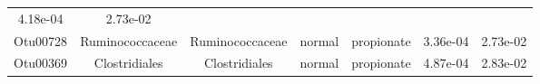 \documentclass[11pt,]{article}
\begin{document}
\begin{longtable}[]{@{}ccccccc@{}}
\begin{minipage}[t]{0.09\columnwidth}
4.18e-04\strut
\end{minipage} & \begin{minipage}[t]{0.09\columnwidth}\centering\strut
2.73e-02\strut
\end{minipage}\tabularnewline
\begin{minipage}[t]{0.09\columnwidth}\centering\strut
Otu00728\strut
\end{minipage} & \begin{minipage}[t]{0.17\columnwidth}\centering\strut
Ruminococcaceae\strut
\end{minipage} & \begin{minipage}[t]{0.17\columnwidth}\centering\strut
Ruminococcaceae\strut
\end{minipage} & \begin{minipage}[t]{0.09\columnwidth}\centering\strut
normal\strut
\end{minipage} & \begin{minipage}[t]{0.11\columnwidth}\centering\strut
propionate\strut
\end{minipage} & \begin{minipage}[t]{0.09\columnwidth}\centering\strut
3.36e-04\strut
\end{minipage} & \begin{minipage}[t]{0.09\columnwidth}\centering\strut
2.73e-02\strut
\end{minipage}\tabularnewline
\begin{minipage}[t]{0.09\columnwidth}\centering\strut
Otu00369\strut
\end{minipage} & \begin{minipage}[t]{0.17\columnwidth}\centering\strut
Clostridiales\strut
\end{minipage} & \begin{minipage}[t]{0.17\columnwidth}\centering\strut
Clostridiales\strut
\end{minipage} & \begin{minipage}[t]{0.09\columnwidth}\centering\strut
normal\strut
\end{minipage} & \begin{minipage}[t]{0.11\columnwidth}\centering\strut
propionate\strut
\end{minipage} & \begin{minipage}[t]{0.09\columnwidth}\centering\strut
4.87e-04\strut
\end{minipage} & \begin{minipage}[t]{0.09\columnwidth}\centering\strut
2.83e-02\strut
\end{minipage}\tabularnewline

\end{longtable}
\end{document}
